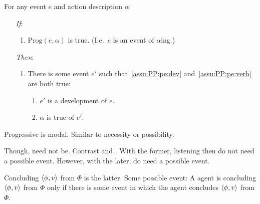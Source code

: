 \begin{note}
  \begin{assumption}[\assuPP{2}]
    \label{assu:PP}
    For any event \(e\) and action description \(\alpha\):
    \begin{enumerate}
    \item[\emph{If}:]
      \begin{enumerate}[label=\alph*., ref=(\alph*)]
      \item
        \(\text{Prog}(e,\alpha)\) is true.%
        \hfill(I.e.\ \(e\) is an event of \(\alpha\)ing.)
      \end{enumerate}
    \item[\emph{Then}:]
      \begin{enumerate}[label=\alph*., ref=(\alph*), resume]
      \item
        There is some  event \(e'\) such that~\ref{assu:PP:pe:dev} and~\ref{assu:PP:pe:verb} are both true:
        \begin{enumerate}[label=\roman*., ref=(\roman*)]
        \item
          \label{assu:PP:pe:dev}
          \(e'\) is a development of \(e\).
        \item
          \label{assu:PP:pe:verb}
          \(\alpha\) is true of \(e'\).
        \end{enumerate}
      \end{enumerate}
    \end{enumerate}
    \vspace{-\baselineskip}
  \end{assumption}

  Progressive is modal.
  Similar to necessity or possibility.

  Though, need not be.
  Contrast  and .
  With the former, listening then do not need a possible event.
  However, with the later, do need a possible event.

  Concluding \(\langle \phi, v \rangle\) from \(\Phi\) is the latter.
  Some possible event:
  A agent is concluding \(\langle \phi, v \rangle\) from \(\Phi\) only if there is some  event in which the agent concludes \(\langle \phi, v \rangle\) from \(\Phi\).
\end{note}

